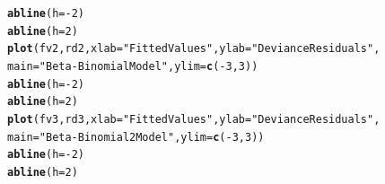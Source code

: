 \documentclass[oneside]{book}\usepackage[]{graphicx}\usepackage[svgnames]{xcolor}
\makeatletter
\newcommand{\hlnum}[1]{\textcolor[rgb]{0.686,0.059,0.569}{#1}}%
\newcommand{\hlstr}[1]{\textcolor[rgb]{0.192,0.494,0.8}{#1}}%
\newcommand{\hlopt}[1]{\textcolor[rgb]{0,0,0}{#1}}%
\newcommand{\hlstd}[1]{\textcolor[rgb]{0.345,0.345,0.345}{#1}}%
\newcommand{\hlkwc}[1]{\textcolor[rgb]{0.333,0.667,0.333}{#1}}%
\newcommand{\hlkwd}[1]{\textcolor[rgb]{0.737,0.353,0.396}{\textbf{#1}}}%
\newenvironment{kframe}{%
 \def\at@end@of@kframe{}%
 \ifinner\ifhmode%
  \def\at@end@of@kframe{\end{minipage}}%
  \begin{minipage}{\columnwidth}%
 \fi\fi%
 \def\FrameCommand##1{\hskip\@totalleftmargin \hskip-\fboxsep
 \colorbox{shadecolor}{##1}\hskip-\fboxsep
     \hskip-\linewidth \hskip-\@totalleftmargin \hskip\columnwidth}%
 \MakeFramed {\advance\hsize-\width
   \@totalleftmargin\z@ \linewidth\hsize
   \@setminipage}}%
 {\par\unskip\endMakeFramed%
 \at@end@of@kframe}
\newenvironment{knitrout}{}{} %
\makeatother
\begin{document}
\begin{knitrout}
\begin{kframe}
\begin{alltt}
\hlkwd{abline}\hlstd{(}\hlkwc{h} \hlstd{=} \hlopt{-}\hlnum{2}\hlstd{)}
\hlkwd{abline}\hlstd{(}\hlkwc{h} \hlstd{=} \hlnum{2}\hlstd{)}
\hlkwd{plot}\hlstd{(fv2, rd2,} \hlkwc{xlab} \hlstd{=} \hlstr{"Fitted Values"}\hlstd{,} \hlkwc{ylab} \hlstd{=} \hlstr{"Deviance Residuals"}\hlstd{,}
  \hlkwc{main} \hlstd{=} \hlstr{"Beta-Binomial Model"}\hlstd{,} \hlkwc{ylim} \hlstd{=} \hlkwd{c}\hlstd{(}\hlopt{-}\hlnum{3}\hlstd{,} \hlnum{3}\hlstd{))}
\hlkwd{abline}\hlstd{(}\hlkwc{h} \hlstd{=} \hlopt{-}\hlnum{2}\hlstd{)}
\hlkwd{abline}\hlstd{(}\hlkwc{h} \hlstd{=} \hlnum{2}\hlstd{)}
\hlkwd{plot}\hlstd{(fv3, rd3,} \hlkwc{xlab} \hlstd{=} \hlstr{"Fitted Values"}\hlstd{,} \hlkwc{ylab} \hlstd{=} \hlstr{"Deviance Residuals"}\hlstd{,}
  \hlkwc{main} \hlstd{=} \hlstr{"Beta-Binomial2 Model"}\hlstd{,} \hlkwc{ylim} \hlstd{=} \hlkwd{c}\hlstd{(}\hlopt{-}\hlnum{3}\hlstd{,} \hlnum{3}\hlstd{))}
\hlkwd{abline}\hlstd{(}\hlkwc{h} \hlstd{=} \hlopt{-}\hlnum{2}\hlstd{)}
\hlkwd{abline}\hlstd{(}\hlkwc{h} \hlstd{=} \hlnum{2}\hlstd{)}
\end{alltt}
\end{kframe}
\end{knitrout}
\end{document}
